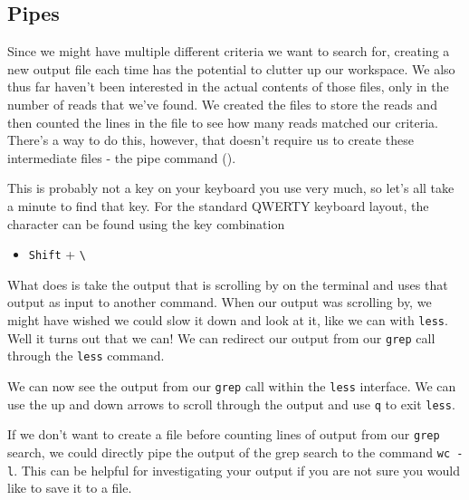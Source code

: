 \documentclass[
  letterpaper,
  DIV=11,
  numbers=noendperiod]{scrreprt}
\newenvironment{Shaded}{\begin{snugshade}}{\end{snugshade}}
\newcommand{\AttributeTok}[1]{\textcolor[rgb]{0.40,0.45,0.13}{#1}}
\newcommand{\ExtensionTok}[1]{\textcolor[rgb]{0.00,0.23,0.31}{#1}}
\newcommand{\FunctionTok}[1]{\textcolor[rgb]{0.28,0.35,0.67}{#1}}
\newcommand{\KeywordTok}[1]{\textcolor[rgb]{0.00,0.23,0.31}{\textbf{#1}}}
\newcommand{\NormalTok}[1]{\textcolor[rgb]{0.00,0.23,0.31}{#1}}
\providecommand{\tightlist}{%
  \setlength{\itemsep}{0pt}\setlength{\parskip}{0pt}}\usepackage{longtable,booktabs,array}
\begin{document}
\subsection{Pipes}\label{pipes}

Since we might have multiple different criteria we want to search for,
creating a new output file each time has the potential to clutter up our
workspace. We also thus far haven't been interested in the actual
contents of those files, only in the number of reads that we've found.
We created the files to store the reads and then counted the lines in
the file to see how many reads matched our criteria. There's a way to do
this, however, that doesn't require us to create these intermediate
files - the pipe command (\texttt{\textbar{}}).

This is probably not a key on your keyboard you use very much, so let's
all take a minute to find that key. For the standard QWERTY keyboard
layout, the \texttt{\textbar{}} character can be found using the key
combination

\begin{itemize}
\tightlist
\item
  \texttt{Shift} + \texttt{\textbackslash{}}
\end{itemize}

What \texttt{\textbar{}} does is take the output that is scrolling by on
the terminal and uses that output as input to another command. When our
output was scrolling by, we might have wished we could slow it down and
look at it, like we can with \texttt{less}. Well it turns out that we
can! We can redirect our output from our \texttt{grep} call through the
\texttt{less} command.

\begin{Shaded}
\end{Shaded}

We can now see the output from our \texttt{grep} call within the
\texttt{less} interface. We can use the up and down arrows to scroll
through the output and use \texttt{q} to exit \texttt{less}.

If we don't want to create a file before counting lines of output from
our \texttt{grep} search, we could directly pipe the output of the grep
search to the command \texttt{wc\ -l}. This can be helpful for
investigating your output if you are not sure you would like to save it
to a file.
\end{document}
